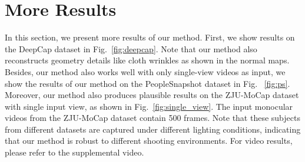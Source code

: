 \section{More Results}
In this section, we present more results of our method.
First, we show results on the DeepCap \cite{deepcap} dataset in Fig.~\ref{fig:deepcap}.
Note that our method also reconstructs geometry details like cloth wrinkles as shown in the normal maps. 
Besides, our method also works well with only single-view videos as input, we show the results of our method on the PeopleSnapshot \cite{alldieck2018video} dataset in Fig.~ \ref{fig:ps}.
Moreover, our method also produces plausible results on the ZJU-MoCap \cite{neuralbody} dataset with single input view, as shown in Fig.~\ref{fig:single_view}.
The input monocular videos from the ZJU-MoCap dataset contain 500 frames.
Note that these subjects from different datasets are captured under different lighting conditions, indicating that our method is robust to different shooting environments. 
For video results, please refer to the supplemental video.